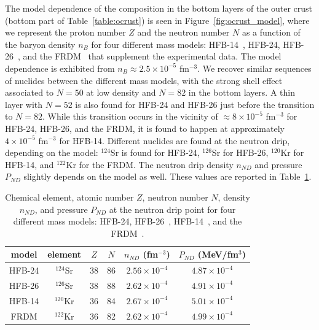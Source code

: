 The model dependence of the composition in the bottom layers of the outer crust 
(bottom part of Table~\ref{table:ocrust}) is seen in
Figure~\ref{fig:ocrust_model}, where we represent the proton number $Z$ and the
neutron number $N$ as a function of the baryon density $n_B$ for four different
mass models: HFB-14~\cite{Goriely2007}, HFB-24, HFB-26~\cite{Goriely2013}, and
the FRDM~\cite{Moller1995} that supplement the experimental data. The model
dependence is exhibited from $n_B \approx 2.5\times 10^{-5}$ fm$^{-3}$. We 
recover similar sequences of nuclides between the different mass models, with
the strong shell effect associated to $N=50$ at low density and $N=82$ in the
bottom layers. A thin layer with $N=52$ is also found for HFB-24 and HFB-26 just before the
transition to $N=82$. While this transition occurs in the vicinity of $\approx 8\times
10^{-5}$ fm$^{-3}$ for HFB-24, HFB-26, and the FRDM, it is found to happen at
approximately $4\times 10^{-5}$ fm$^{-3}$ for HFB-14. Different nuclides are 
found at the neutron drip, depending on the model: $^{124}$Sr is found for
HFB-24, $^{126}$Sr for HFB-26, $^{120}$Kr for HFB-14, and $^{122}$Kr for the FRDM. 
The neutron drip density $n_{ND}$ and pressure $P_{ND}$ slightly depends on 
the model as well. These values are reported in Table~\ref{table:drip}.

\begin{table}
\begin{center}
\begin{tabular}{cccccc} 
  \toprule
  \toprule
  model & element & $Z$ & $N$ & $n_{ND}$ (fm$^{-3}$) & $P_{ND}$ (MeV/fm$^3$)\\
  \midrule
  HFB-24 & $^{124}$Sr & 38 & 86 & $2.56\times 10^{-4}$ & $4.87\times 10^{-4}$\\
  HFB-26 & $^{126}$Sr & 38 & 88 & $2.62\times 10^{-4}$ & $4.91\times 10^{-4}$\\
  HFB-14 & $^{120}$Kr & 36 & 84 & $2.67\times 10^{-4}$ & $5.01\times 10^{-4}$\\
  FRDM   & $^{122}$Kr & 36 & 82 & $2.62\times 10^{-4}$ & $4.99\times 10^{-4}$\\
  \bottomrule
  \bottomrule
\end{tabular}
\end{center}
\caption[Ground state of matter at the neutron-drip point]{Chemical element, atomic 
  number $Z$, neutron number $N$, density
$n_{ND}$, and pressure $P_{ND}$ at the neutron drip point for four different
mass models: HFB-24, HFB-26~\cite{Goriely2013}, HFB-14~\cite{Goriely2007}, and
the FRDM~\cite{Moller1995}.}\label{table:drip} 
\end{table}

